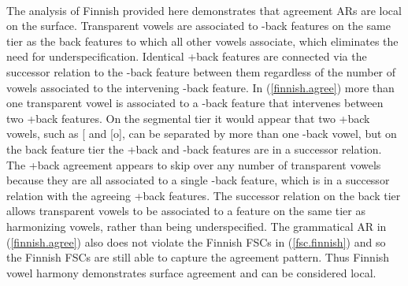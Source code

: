 \documentclass[,doc,floatsintext]{apa6}
\theoremstyle{definition}
\theoremstyle{definition}
\theoremstyle{definition}
\theoremstyle{remark}
\begin{document}
\begin{exe}
\label{finnish.agree} \\

\end{exe}

The analysis of Finnish provided here demonstrates that agreement ARs
are local on the surface. Transparent vowels are associated to -back
features on the same tier as the back features to which all other vowels
associate, which eliminates the need for underspecification. Identical
+back features are connected via the successor relation to the -back
feature between them regardless of the number of vowels associated to
the intervening -back feature. In (\ref{finnish.agree}) more than one
transparent vowel is associated to a -back feature that intervenes
between two +back features. On the segmental tier it would appear that
two +back vowels, such as {[}\textipa{A}{]} and {[}o{]}, can be
separated by more than one -back vowel, but on the back feature tier the
+back and -back features are in a successor relation. The +back
agreement appears to skip over any number of transparent vowels because
they are all associated to a single -back feature, which is in a
successor relation with the agreeing +back features. The successor
relation on the back tier allows transparent vowels to be associated to
a feature on the same tier as harmonizing vowels, rather than being
underspecified. The grammatical AR in (\ref{finnish.agree}) also does
not violate the Finnish FSCs in (\ref{fsc.finnish}) and so the Finnish
FSCs are still able to capture the agreement pattern. Thus Finnish vowel
harmony demonstrates surface agreement and can be considered local.
\end{document}

